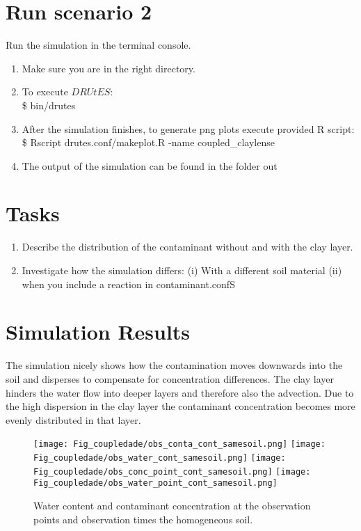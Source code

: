 \section*{Run scenario 2}
Run the simulation in the terminal console.
\begin{enumerate}
	\item Make sure you are in the right directory. 
	\item To execute $DRUtES$: \\
	\$ bin/drutes
	\item After the simulation finishes, to generate png plots execute provided R script: \\
	\$ Rscript drutes.conf/makeplot.R -name coupled\_claylense \\
	\item The output of the simulation can be found in the folder out
\end{enumerate}


\section*{Tasks}

\begin{enumerate}
\item Describe the distribution of the contaminant without and with the clay layer.
\item Investigate how the simulation differs: (i) With a different soil material (ii) when you include a reaction in contaminant.confS
\end{enumerate}

\newpage

\section*{Simulation Results}

The simulation nicely shows how the contamination moves downwards into the soil and disperses to compensate for concentration differences. The clay layer hinders the water flow into deeper layers and therefore also the advection. Due to the high dispersion in the clay layer the contaminant concentration becomes more evenly distributed in that layer. 


\begin{figure}[!h]
	\centering
	\texttt{[image: Fig\_coupledade/obs\_conta\_cont\_samesoil.png]}
	\texttt{[image: Fig\_coupledade/obs\_water\_cont\_samesoil.png]}
	\texttt{[image: Fig\_coupledade/obs\_conc\_point\_cont\_samesoil.png]}
	\texttt{[image: Fig\_coupledade/obs\_water\_point\_cont\_samesoil.png]}
	\caption{Water content  and contaminant concentration at the observation points and observation times the homogeneous soil.}
\end{figure}

